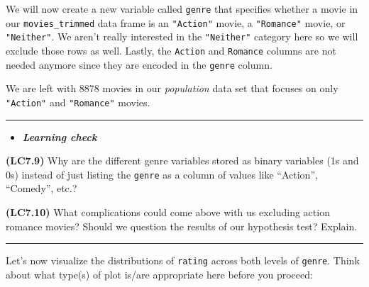 \documentclass[]{tufte-book}
\newenvironment{Shaded}{\begin{snugshade}}{\end{snugshade}}
\newcommand{\KeywordTok}[1]{\textcolor[rgb]{0.13,0.29,0.53}{\textbf{{#1}}}}
\newcommand{\DataTypeTok}[1]{\textcolor[rgb]{0.13,0.29,0.53}{{#1}}}
\newcommand{\DecValTok}[1]{\textcolor[rgb]{0.00,0.00,0.81}{{#1}}}
\newcommand{\StringTok}[1]{\textcolor[rgb]{0.31,0.60,0.02}{{#1}}}
\newcommand{\NormalTok}[1]{{#1}}
\let\oldrule=\rule
\renewcommand{\rule}[1]{\oldrule{\linewidth}}
\newenvironment{rmdblock}[1]
  {\begin{shaded*}
  \begin{itemize}
  \renewcommand{\labelitemi}{
    \raisebox{-.7\height}[0pt][0pt]{
    }
  }
  \item
  }
  {
  \end{itemize}
  \end{shaded*}
  }
\newenvironment{learncheck}
  {\begin{rmdblock}{warning}}
  {\end{rmdblock}}
\begin{document}
We will now create a new variable called \texttt{genre} that specifies
whether a movie in our \texttt{movies\_trimmed} data frame is an
\texttt{"Action"} movie, a \texttt{"Romance"} movie, or
\texttt{"Neither"}. We aren't really interested in the
\texttt{"Neither"} category here so we will exclude those rows as well.
Lastly, the \texttt{Action} and \texttt{Romance} columns are not needed
anymore since they are encoded in the \texttt{genre} column.

\begin{Shaded}
\end{Shaded}

We are left with 8878 movies in our \emph{population} data set that
focuses on only \texttt{"Action"} and \texttt{"Romance"} movies.

\begin{center}\rule{0.5\linewidth}{\linethickness}\end{center}

\begin{learncheck}
\textbf{\emph{Learning check}}
\end{learncheck}

\textbf{(LC7.9)} Why are the different genre variables stored as binary
variables (1s and 0s) instead of just listing the \texttt{genre} as a
column of values like ``Action'', ``Comedy'', etc.?

\textbf{(LC7.10)} What complications could come above with us excluding
action romance movies? Should we question the results of our hypothesis
test? Explain.

\begin{center}\rule{0.5\linewidth}{\linethickness}\end{center}

Let's now visualize the distributions of \texttt{rating} across both
levels of \texttt{genre}. Think about what type(s) of plot is/are
appropriate here before you proceed:
\end{document}
